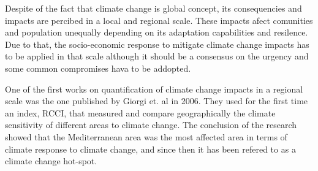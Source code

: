 

Despite of the fact that climate change is global concept, its consequencies and impacts are percibed in a local and regional scale. These impacts afect comunities and population unequally depending on its adaptation capabilities and resilence. Due to that, the socio-economic response to mitigate climate change impacts has to be applied in that scale although it should be a consensus on the urgency and some common compromises hava to be addopted.


One of the first works on quantification of climate change impacts in a regional scale was the one published by Giorgi et. al in 2006. They used for the first time an index, RCCI, that measured and compare geographically the climate sensitivity of different areas to climate change. The conclusion of the research showed that the Mediterranean area was the most affected area in terms of climate response to climate change, and since then it has been refered to as a climate change hot-spot.

